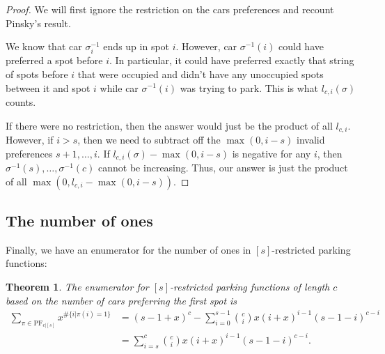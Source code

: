 \documentclass[12 pt]{amsart}
\newtheorem{theorem}{Theorem}[section]
\theoremstyle{definition} %
\theoremstyle{remark} %
\begin{document}
\begin{proof} 
	We will first ignore the restriction on the cars preferences and recount Pinsky's result.

	We know that car $\sigma_{i}^{-1}$ ends up in spot $i$. However, car $\sigma^{-1}(i)$ could have preferred a spot before $i$. In particular, it could have preferred exactly that string of spots before $i$ that were occupied and didn't have any unoccupied spots between it and spot $i$ while car $\sigma^{-1}(i)$ was trying to park. This is what $l_{c, i}(\sigma)$ counts. 

	If there were no restriction, then the answer would just be the product of all $l_{c, i}$. However, if $i > s$, then we need to subtract off the $\max(0, i - s)$ invalid preferences $s + 1, \dots, i$. If $l_{c, i}(\sigma) - \max(0, i - s)$ is negative for any $i$, then $\sigma^{-1}(s), \dots, \sigma^{-1}(c)$ cannot be increasing. Thus, our answer is just the product of all $\max(0, l_{c, i} - \max(0, i - s))$.
\end{proof}

\subsection{The number of ones}

Finally, we have an enumerator for the number of ones in $[s]$-restricted parking functions:

\begin{theorem}
\label{thm:restricted-1s-enumerator}
	The enumerator for $[s]$-restricted parking functions of length $c$ based on the number of cars preferring the first spot is
	\[
		\begin{split}
			 \sum_{\pi\in\mathrm{PF}_{c|[s]}}x^{\#\{i|\pi(i)=1\}} & = (s-1 + x)^{c} - \sum_{i = 0}^{s-1} \binom{c}{i} x(i + x)^{i - 1} (s-1 - i)^{c - i} \\
				    & = \sum_{i = s}^{c} \binom{c}{i} x(i+x)^{i - 1} (s-1 - i)^{c - i}.
		\end{split}
	\]
\end{theorem}
\end{document}
